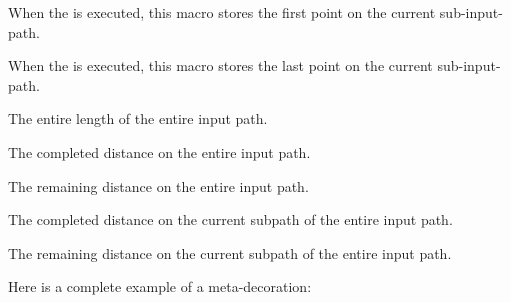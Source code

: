 \begin{command}{\pgfdeclaremetadecorate{}}
\begin{command}{\state{}}
    \begin{command}{\pgfpointmetadecoratedpathfirst}
      When the  is executed,
      this macro stores the first point on the current
      sub-input-path. 
    \end{command}

    \begin{command}{\pgfpointmetadecoratedpathlast}
      When the  is executed,
      this macro stores the last point on the current
      sub-input-path. 
    \end{command}
    
    \begin{command}{\pgfmetadecoratedpathlength}
      The entire length of the entire input path.
    \end{command}    
    
    \begin{command}{\pgfmetadecoratedcompleteddistance}
      The completed distance on the entire input path.
    \end{command}
    
    \begin{command}{\pgfmetadecoratedremainingdistance}
      The remaining distance on the entire input path.
    \end{command}
    
    \begin{command}{\pgfmetadecoratedsubpathcompleteddistance}
      The completed distance on the current subpath of the entire
      input path.
    \end{command}
    
    \begin{command}{\pgfmetadecoratedsubpathremainingdistance}
      The remaining distance on the current subpath of the entire
      input path.
    \end{command}
  \end{command}

  Here is a complete example of a meta-decoration:


\end{command}
